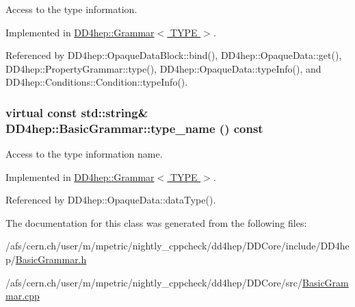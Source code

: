 Access to the type information. 

Implemented in \hyperlink{class_d_d4hep_1_1_grammar_a5fcd84c1a1f9b641083264f6127cf431}{DD4hep::Grammar$<$ TYPE $>$}.

Referenced by DD4hep::OpaqueDataBlock::bind(), DD4hep::OpaqueData::get(), DD4hep::PropertyGrammar::type(), DD4hep::OpaqueData::typeInfo(), and DD4hep::Conditions::Condition::typeInfo().\hypertarget{class_d_d4hep_1_1_basic_grammar_acae3770beb2e60eaf76c7d85722c8bc2}{
\subsubsection[{type\_\-name}]{\setlength{\rightskip}{0pt plus 5cm}virtual const std::string\& DD4hep::BasicGrammar::type\_\-name () const}}
\label{class_d_d4hep_1_1_basic_grammar_acae3770beb2e60eaf76c7d85722c8bc2}


Access to the type information name. 

Implemented in \hyperlink{class_d_d4hep_1_1_grammar_aeeaf492d2fab90c5d5fb032f7efaa42e}{DD4hep::Grammar$<$ TYPE $>$}.

Referenced by DD4hep::OpaqueData::dataType().

The documentation for this class was generated from the following files:\begin{DoxyCompactItemize}
\item 
/afs/cern.ch/user/m/mpetric/nightly\_\-cppcheck/dd4hep/DDCore/include/DD4hep/\hyperlink{_basic_grammar_8h}{BasicGrammar.h}\item 
/afs/cern.ch/user/m/mpetric/nightly\_\-cppcheck/dd4hep/DDCore/src/\hyperlink{_basic_grammar_8cpp}{BasicGrammar.cpp}\end{DoxyCompactItemize}

